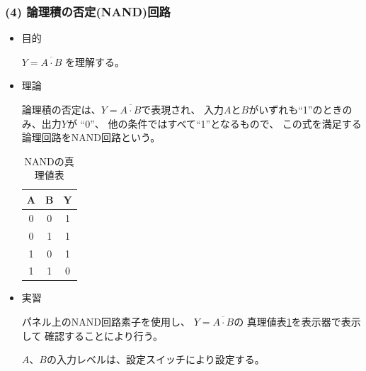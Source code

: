 \documentclass[12pt]{jarticle}
\begin{document}
\subsubsection*{(4) 論理積の否定(NAND)回路}
\begin{itemize}
    \item 目的

          $Y = \overline{A \cdot B}$ を理解する。

    \item 理論

          論理積の否定は、$Y = \overline{A \cdot B}$で表現され、
          入力$A$と$B$がいずれも``1''のときのみ、出力$Y$が ``0''、
          他の条件ではすべて``1''となるもので、
          この式を満足する論理回路をNAND回路という。

          \begin{table}[h]
              \caption{NANDの真理値表}
              \begin{center}
                  \begin{tabular}{|c|c|c|}
                      \hline
                      A & B & Y \\
                      \hline
                      0 & 0 & 1 \\
                      \hline
                      0 & 1 & 1 \\
                      \hline
                      1 & 0 & 1 \\
                      \hline
                      1 & 1 & 0 \\
                      \hline
                  \end{tabular}
              \end{center}
              \label{table4}
          \end{table}

    \item 実習

          パネル上のNAND回路素子を使用し、
          $Y = \overline{A \cdot B}$の
          真理値表\ref{table4}を表示器で表示して
          確認することにより行う。

          $A$、$B$の入力レベルは、設定スイッチにより設定する。
\end{itemize}

\clearpage
\end{document}
